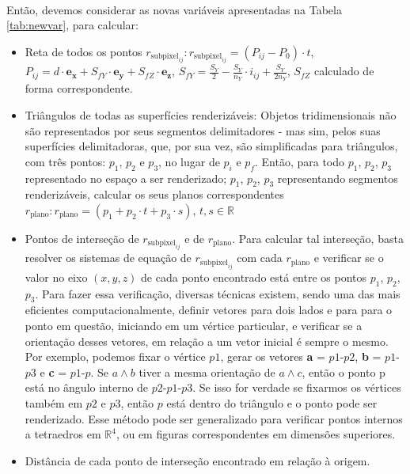 \documentclass{article}
\newcommand\R{\mathbb{R}}
\begin{document}
	\paragraph{}
	Então, devemos considerar as novas variáveis apresentadas na Tabela \ref{tab:newvar}, para calcular:
		
	\begin{itemize}
		\item Reta de todos os pontos $r_{\text{subpixel}_{ij}} : r_{\text{subpixel}_{ij}} = (P_{ij} - P_0) \cdot t$, $P_{ij} = d \cdot \boldsymbol{e_x} + S_{fY} \cdot \boldsymbol{e_y} + S_{fZ} \cdot \boldsymbol{e_z}$, $S_{fY} = \frac{S_Y}{2} - \frac{S_Y}{n_Y} \cdot i_{ij} + \frac{S_Y}{2n_Y}$, $S_{fZ}$ calculado de forma correspondente.
		\item Triângulos de todas as superfícies renderizáveis: Objetos tridimensionais não são representados por seus segmentos delimitadores - mas sim, pelos suas superfícies delimitadoras, que, por sua vez, são simplificadas para triângulos, com três pontos: $p_1$, $p_2$ e $p_3$, no lugar de $p_i$ e $p_f$. Então, para todo $p_1$, $p_2$, $p_3$ representado no espaço a ser renderizado;  $p_1$, $p_2$, $p_3$ representando segmentos renderizáveis, calcular os seus planos correspondentes $r_\text{plano}: r_\text{plano} = (p_1 + p_2 \cdot t + p_3 \cdot s)$, $t,s \in \R$
		\item Pontos de interseção de $r_{\text{subpixel}_{ij}}$ e de $r_\text{plano}$. Para calcular tal interseção, basta resolver os sistemas de equação de $r_{\text{subpixel}_{ij}}$ com cada $r_\text{plano}$ e verificar se o valor no eixo $(x,y,z)$ de cada ponto encontrado está entre os pontos $p_1$, $p_2$, $p_3$. Para fazer essa verificação, diversas técnicas existem, sendo uma das mais eficientes computacionalmente, definir vetores para dois lados e para para o ponto em questão, iniciando em um vértice particular, e verificar se a orientação desses vetores, em relação a um vetor inicial é sempre o mesmo. Por exemplo, podemos fixar o vértice $p1$, gerar os vetores \textbf{a} = $p1$-$p2$, \textbf{b} = $p1$-$p3$ e \textbf{c} = $p1$-$p$. Se $a \wedge b$ tiver a mesma orientação de $a \wedge c$, então o ponto p está no ângulo interno de $p2$-$p1$-$p3$. Se isso for verdade se fixarmos os vértices também em $p2$ e $p3$, então $p$ está dentro do triângulo e o ponto pode ser renderizado. Esse método pode ser generalizado para verificar pontos internos a tetraedros em $\R^4$, ou em figuras correspondentes em dimensões superiores.
		\item Distância de cada ponto de interseção encontrado em relação à origem.
	\end{itemize}
	
\end{document}
